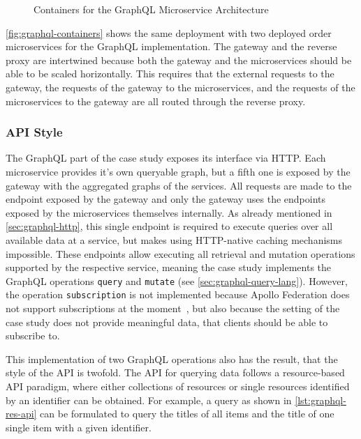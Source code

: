 \begin{figure}[!htb]
    \centering
    
    \caption{Containers for the GraphQL Microservice Architecture}\label{fig:graphql-containers}
\end{figure}

\autoref{fig:graphql-containers} shows the same deployment with two deployed order microservices for the GraphQL implementation.
The gateway and the reverse proxy are intertwined because both the gateway and the microservices should be able to be scaled horizontally.
This requires that the external requests to the gateway, the requests of the gateway to the microservices, and the requests of the microservices to the gateway are all routed through the reverse proxy.

\subsubsection{\acs{API} Style}

The GraphQL part of the case study exposes its interface via \ac{HTTP}.
Each microservice provides it's own queryable graph, but a fifth one is exposed by the gateway with the aggregated graphs of the services.
All requests are made to the endpoint exposed by the gateway and only the gateway uses the endpoints exposed by the microservices themselves internally.
As already mentioned in \autoref{sec:graphql-http}, this single endpoint is required to execute queries over all available data at a service, but makes using \ac{HTTP}-native caching mechanisms impossible.
These endpoints allow executing all retrieval and mutation operations supported by the respective service, meaning the case study implements the GraphQL operations \texttt{query} and \texttt{mutate} (see \autoref{sec:graphql-query-lang}).
However, the operation \texttt{subscription} is not implemented because Apollo Federation does not support subscriptions at the moment~\cite{MDG}, but also because the setting of the case study does not provide meaningful data, that clients should be able to subscribe to.

This implementation of two GraphQL operations also has the result, that the style of the \ac{API} is twofold.
The \ac{API} for querying data follows a resource-based \ac{API} paradigm, where either collections of resources or single resources identified by an identifier can be obtained.
For example, a query as shown in \autoref{lst:graphql-res-api} can be formulated to query the titles of all items and the title of one single item with a given identifier.


